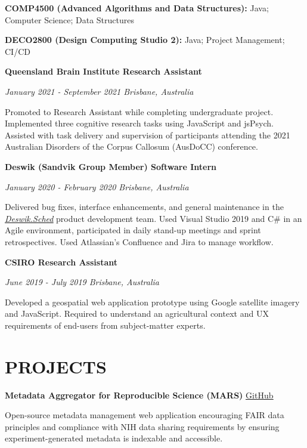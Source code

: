 \documentclass{article}
\begin{document}
  \textbf{COMP4500 (Advanced Algorithms and Data Structures):} Java; Computer Science; Data Structures

  \textbf{DECO2800 (Design Computing Studio 2):} Java; Project Management; CI/CD

  \medbreak

  {\large\textbf{Queensland Brain Institute \hfill Research Assistant}}

  \textit{January 2021 - September 2021 \hfill Brisbane, Australia}

  Promoted to Research Assistant while completing undergraduate project. Implemented three cognitive research tasks using JavaScript and jsPsych. Assisted with task delivery and supervision of participants attending the 2021 Australian Disorders of the Corpus Callosum (AusDoCC) conference.

  \pagebreak

  {\large\textbf{Deswik (Sandvik Group Member) \hfill Software Intern}}

  \textit{January 2020 - February 2020 \hfill Brisbane, Australia}

  Delivered bug fixes, interface enhancements, and general maintenance in the \href{https://www.deswik.com/product-detail/deswik-scheduler/}{\color{blue}\underline{\textit{Deswik.Sched}}} product development team. Used Visual Studio 2019 and C\# in an Agile environment, participated in daily stand-up meetings and sprint retrospectives. Used Atlassian's Confluence and Jira to manage workflow.

  \medbreak

  {\large\textbf{CSIRO \hfill Research Assistant}}

  \textit{June 2019 - July 2019 \hfill Brisbane, Australia}

  Developed a geospatial web application prototype using Google satellite imagery and JavaScript. Required to understand an agricultural context and UX requirements of end-users from subject-matter experts.

  \section*{\centering\uppercase{Projects}}

  \textbf{Metadata Aggregator for Reproducible Science (MARS)} \hfill \href{https://github.com/Brain-Development-and-Disorders-Lab/mars}{\color{blue}\underline{GitHub}}

  Open-source metadata management web application encouraging FAIR data principles and compliance with NIH data sharing requirements by ensuring experiment-generated metadata is indexable and accessible.
\end{document}
